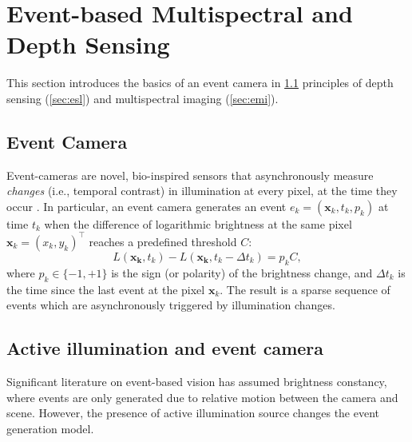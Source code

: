 \section{Event-based Multispectral and Depth Sensing}
This section introduces the basics of an event camera in \Sec \ref{sec:eventcam} principles of depth sensing (\Sec \ref{sec:esl}) and multispectral imaging (\Sec \ref{sec:emi}).

\subsection{Event Camera}
\label{sec:eventcam}
Event-cameras are novel, bio-inspired sensors that asynchronously measure \emph{changes} (i.e., temporal contrast) in illumination at every pixel, at the time they occur \cite{Lichtsteiner08ssc,Suh20iscas,Finateu20isscc, Posch11ssc}.
In particular, an event camera generates an event $e_k = (\mathbf{x}_k,t_k,p_k)$ at time $t_k$ when the difference of logarithmic brightness at the same pixel $\mathbf{x}_k=(x_k,y_k)^\top$  reaches a predefined threshold $C$:
\begin{equation}
\label{eq:egm}
    L(\mathbf{x_k},t_k) - L(\mathbf{x_k},t_k-\Delta t_k) = p_k C,
\end{equation}
where $p_k \in \{-1,+1\}$ is the sign (or polarity) of the brightness change, 
and $\Delta t_k$ is the time since the last event at the pixel $\mathbf{x}_k$. The result is a sparse sequence of events which are asynchronously triggered by illumination changes.

\subsection{Active illumination and event camera}
Significant literature on event-based vision has assumed brightness constancy, where events are only generated due to relative motion between the camera and scene.
However, the presence of active illumination source changes the event generation model.

